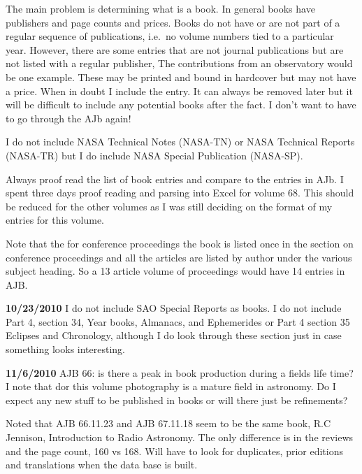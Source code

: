 The main problem is determining what is a book. In general books have
publishers and page counts and prices.  Books do not have or are not
part of a regular sequence of publications, i.e.\ no volume numbers
tied to a particular year.  However, there are some entries that are
not journal publications but are not listed with a regular publisher,
The contributions from an observatory would be one example.  These may
be printed and bound in hardcover but may not have a price.  When in
doubt I include the entry.  It can always be removed later but it will
be difficult to include any potential books after the fact. I don't
want to have to go through the AJb again!

I do not include NASA Technical Notes (NASA-TN) or NASA Technical
Reports (NASA-TR) but I do include NASA Special Publication (NASA-SP).

Always proof read the list of book entries and compare to the entries
in AJb. I spent three days proof reading and parsing into Excel for
volume 68. This should be reduced for the other volumes as I was still
deciding on the format of my entries for this volume.

Note that the for conference proceedings the book is listed once in
the section on conference proceedings and all the articles are listed
by author under the various subject heading. So a 13 article volume of
proceedings would have 14 entries in AJB.

{\bf 10/23/2010}
I do not include SAO Special Reports as books. I do not include Part
4, section 34, Year books, Almanacs, and Ephemerides or Part 4 section
35 Eclipses and Chronology, although I do look through these section
just in case something looks interesting.

{\bf 11/6/2010}
AJB 66: is there a peak in book production during a fields life time?
I note that dor this volume photography is a mature field in
astronomy.  Do I expect any new stuff to be published in books or will
there just be refinements?

Noted that AJB 66.11.23 and AJB 67.11.18 seem to be the same book, R.C
Jennison, Introduction to Radio Astronomy. The only difference is in
the reviews and the page count, 160 vs 168.  Will have to look for
duplicates, prior editions and translations when the data base is built.


